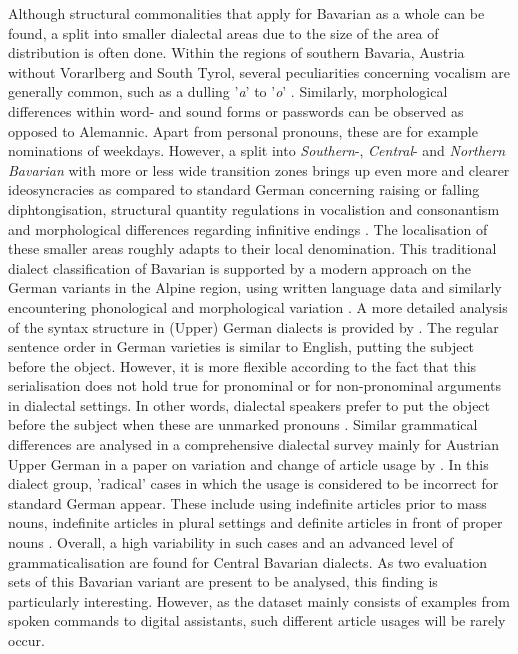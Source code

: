 \documentclass[11pt,a4paper,twoside,openright]{scrbook}
\begin{document}
Although structural commonalities that apply for Bavarian as a whole can be found, a split into smaller dialectal areas due to the size of the area of distribution is often done. Within the regions of southern Bavaria, Austria without Vorarlberg and South Tyrol, several peculiarities concerning vocalism are generally common, such as a dulling '\textit{a}' to '\textit{o}' \citep{wiesinger1983deutschedialekte, VergeinerBülow+2023}. Similarly, morphological differences within word- and sound forms or passwords can be observed as opposed to Alemannic. Apart from personal pronouns, these are for example nominations of weekdays. However, a split into \textit{Southern}-, \textit{Central}- and \textit{Northern Bavarian} with more or less wide transition zones brings up even more and clearer ideosyncracies as compared to standard German concerning raising or falling diphtongisation, structural quantity regulations in vocalistion and consonantism and morphological differences regarding infinitive endings \citep{wiesinger1983deutschedialekte, VergeinerBülow+2023}. The localisation of these smaller areas roughly adapts to their local denomination. This traditional dialect classification of Bavarian is supported by a modern approach on the German variants in the Alpine region, using written language data and similarly encountering phonological and morphological variation \citep{VergeinerBülow+2023}. A more detailed analysis of the syntax structure in (Upper) German dialects is provided by \citet{weiß_dialect_structure}. The regular sentence order in German varieties is similar to English, putting the subject before the object. However, it is more flexible according to the fact that this serialisation does not hold true for pronominal or for non-pronominal arguments in dialectal settings. In other words, dialectal speakers prefer to put the object before the subject when these are unmarked pronouns \citep{weiß_dialect_structure}. Similar grammatical differences are analysed in a comprehensive dialectal survey mainly for Austrian Upper German in a paper on variation and change of article usage by \citet{vergeiner_articleS_dialect}. In this dialect group, 'radical' cases in which the usage is considered to be incorrect for standard German appear. These include using indefinite articles prior to mass nouns, indefinite articles in plural settings and definite articles in front of proper nouns \citep{vergeiner_articleS_dialect}. Overall, a high variability in such cases and an advanced level of grammaticalisation are found for Central Bavarian dialects. As two evaluation sets of this Bavarian variant are present to be analysed, this finding is particularly interesting. However, as the dataset mainly consists of examples from spoken commands to digital assistants, such different article usages will be rarely occur. 
\end{document}
